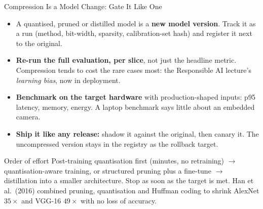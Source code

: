 \begin{frame}{Compression Is a Model Change: Gate It Like One}

    \begin{itemize}
        \item A quantised, pruned or distilled model is a \textbf{new model version}. Track it as a run
              (method, bit-width, sparsity, calibration-set hash) and register it next to the original.
        \item \textbf{Re-run the full evaluation, per slice}, not just the headline metric. Compression tends
              to cost the rare cases most: the Responsible AI lecture's \emph{learning bias}, now in
              deployment.
        \item \textbf{Benchmark on the target hardware} with production-shaped inputs: p95 latency, memory,
              energy. A laptop benchmark says little about an embedded camera.
        \item \textbf{Ship it like any release:} shadow it against the original, then canary it. The
              uncompressed version stays in the registry as the rollback target.
    \end{itemize}

    \vspace{0.4em}
    \begin{block}{Order of effort}
        Post-training quantisation first (minutes, no retraining) $\rightarrow$ quantisation-aware training,
        or structured pruning plus a fine-tune $\rightarrow$ distillation into a smaller architecture. Stop
        as soon as the target is met. Han et al.\ (2016) combined pruning, quantisation and Huffman coding to
        shrink AlexNet $35\times$ and VGG-16 $49\times$ with no loss of accuracy.
    \end{block}

\end{frame}
